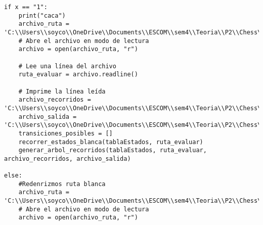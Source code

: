\begin{enumerate}
\begin{lstlisting}
if x == "1":
    print("caca")
    archivo_ruta = 'C:\\Users\\soyco\\OneDrive\\Documents\\ESCOM\\sem4\\Teoria\\P2\\Chess\\output\\ruta_blanca.txt'
    # Abre el archivo en modo de lectura
    archivo = open(archivo_ruta, "r")

    # Lee una línea del archivo
    ruta_evaluar = archivo.readline()

    # Imprime la línea leída
    archivo_recorridos = 'C:\\Users\\soyco\\OneDrive\\Documents\\ESCOM\\sem4\\Teoria\\P2\\Chess\\output\\recorridos_blanca.txt'
    archivo_salida = 'C:\\Users\\soyco\\OneDrive\\Documents\\ESCOM\\sem4\\Teoria\\P2\\Chess\\output\\arbol_blanca.dot'
    transiciones_posibles = []
    recorrer_estados_blanca(tablaEstados, ruta_evaluar)
    generar_arbol_recorridos(tablaEstados, ruta_evaluar, archivo_recorridos, archivo_salida)
    
else:
    #Redenrizmos ruta blanca
    archivo_ruta = 'C:\\Users\\soyco\\OneDrive\\Documents\\ESCOM\\sem4\\Teoria\\P2\\Chess\\output\\ruta_blanca.txt'
    # Abre el archivo en modo de lectura
    archivo = open(archivo_ruta, "r")


\end{lstlisting}
\end{enumerate}
